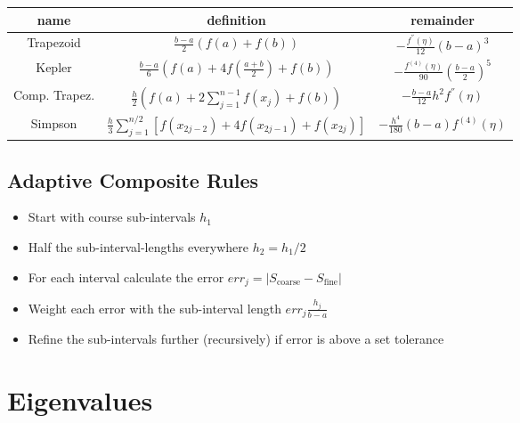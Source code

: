 \documentclass[
    a4paper,
    11pt
]{article}
\begin{document}
\begin{table}[H]
    \centering
    \begin{tabulary}{\linewidth}{C C C}
        \toprule
        name & definition & remainder\\
        \midrule
        Trapezoid &
            $\displaystyle \frac{b-a}{2} (f(a) + f(b)) $ &
            $\displaystyle -\frac{f^{''}(\eta)}{12}(b-a)^3$
        \\
        Kepler &
            $\displaystyle \frac{b-a}{6} \left( f(a) + 4f(\frac{a+b}{2}) + f(b)
            \right)$ &
            $\displaystyle - \frac{f^{(4)}(\eta)}{90} \left(\frac{b-a}{2}
            \right)^5$
        \\
        \midrule
        Comp. Trapez. &
            $\displaystyle \frac{h}{2} \left( f(a) + 2 \sum_{j=1}^{n-1}f(x_j) +
            f(b) \right) $ &
            $\displaystyle - \frac{b-a}{12} h^2 f^{''}(\eta)$
        \\
        Simpson &
            $\displaystyle \frac{h}{3} \sum_{j=1}^{n/2} \left[ f(x_{2j-2}) + 4
            f(x_{2j-1}) + f(x_{2j}) \right] $ &
            $\displaystyle - \frac{h^4}{180}(b-a) f^{(4)}(\eta)$
        \\

        \bottomrule

    \end{tabulary}
\end{table}

\subsection{Adaptive Composite Rules}

\begin{itemize}
    \item Start with course sub-intervals $h_1$
    \item Half the sub-interval-lengths everywhere $h_2=h_1/2$
    \item For each interval calculate the error $err_j = |S_{\text{coarse}} -
        S_{\text{fine}}|$
    \item Weight each error with the sub-interval length $err_j \frac{h_j}{b-a}$
    \item Refine the sub-intervals further (recursively) if error is above a set
        tolerance
\end{itemize}



\section{Eigenvalues}
\end{document}
